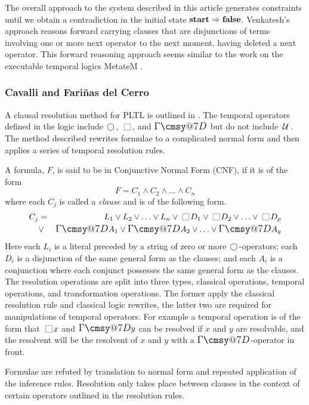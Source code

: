 \documentclass[nohyperref]{acmtrans2f}
\makeatletter
\def\sometime{\mathord{\hbox{\large$\mathchar"0\cmsy@7D$}}}
\newcommand{\always}{\raisebox{-.2ex}{
                           \mbox{\unitlength=0.9ex
                           \begin{picture}(2,2)
                           \linethickness{0.06ex}
                           \put(0,0){\line(1,0){2}}
                           \put(0,2){\line(1,0){2}}
                           \put(0,0){\line(0,1){2}}
                           \put(2,0){\line(0,1){2}}
                           \end{picture}}}
                          \,}
\newcommand{\next}{\!\raisebox{-.2ex}{ %
                        \mbox{\unitlength=0.9ex
                        \begin{picture}(2,2)
                        \linethickness{0.06ex}
                        \put(1,1){\circle{2}} %
                        \end{picture}}}       %
                        \,}
\def\until{\hbox{$\,\cal U \,$}}
\let\imp=\Rightarrow
\def\lfalse{\hbox{\rm\bf false}}
\def\lstart{\hbox{\rm\bf start}}
\makeatother
\begin{document}
The overall approach to  the system described in this article generates
constraints until we 
obtain a contradiction in the initial state $\lstart \imp
\lfalse$. Venkatesh's approach reasons forward carrying clauses that are
disjunctions of terms involving one or more next operator to the next
moment, having deleted a next operator. This forward reasoning approach
seems similar to the work on the executable temporal logics {\sc
MetateM} \cite{BFGOR96:book}.


\subsubsection{Cavalli and Fari{\~n}as del Cerro}
A clausal resolution method for PLTL is outlined in . 
The temporal operators defined in the logic include $\next$, $\always$, and
$\sometime$ but do not include $\until$.
The method described rewrites formulae to 
a complicated normal form and then applies a series of temporal resolution rules.

A formula, $F$, is said to be in 
Conjunctive Normal Form (CNF), if it is of the form
\begin{displaymath}
F = C_1 \land C_2 \land \ldots \land C_n
\end{displaymath}
where each $C_j$ is called a {\em clause} and is of the following form.
\begin{eqnarray}
C_j & = & L_1 \lor L_2 \lor \ldots \lor L_n \lor \always D_1 \lor \always D_2 \lor \ldots \lor \always D_p \nonumber\\
& \lor & \sometime A_1 \lor \sometime A_2 \lor \ldots \lor \sometime A_q \nonumber
\end{eqnarray}
Here each 
$L_i$ is a literal preceded by a string of zero or more $\next$-operators;
each $D_i$ is a disjunction of the same general form as the clauses; 
and each $A_i$ is a conjunction where each conjunct possesses the same
general form as the clauses. 
The resolution operations are split into three types, classical operations,
temporal operations, and transformation operations. The former apply the
classical resolution rule and classical logic rewrites, the latter two are
required for manipulations of temporal operators.
For example a temporal operation is of the form
that $\always x$ and $\sometime y$ can be resolved if $x$ and $y$ are
resolvable, and the resolvent will be the resolvent of $x$ and $y$ with a
$\sometime$-operator in front.

Formulae are refuted by translation to normal form and repeated application
of the inference rules. Resolution only takes place between clauses
in the context of certain operators outlined in the resolution rules.
\end{document}

